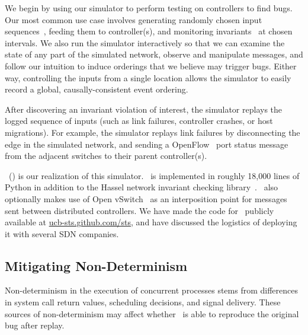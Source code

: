 We begin by using our simulator to perform testing on controllers to find
bugs. Our most common use case involves generating randomly chosen input
sequences~\cite{Miller:1990:ESR:96267.96279}, feeding them to controller(s),
and monitoring
invariants~\cite{hsa} at chosen intervals.
We also run the simulator interactively
so that we can examine the state of any part of the simulated network,
observe and manipulate messages, and follow our
intuition to induce orderings that we believe may trigger bugs.
Either way, controlling the inputs from a single location
allows the simulator to easily record a global, causally-consistent
event ordering.

After discovering an invariant violation of interest, the simulator replays
the logged sequence of inputs (such as link failures, controller crashes, or host
migrations). For example, the simulator replays link failures
by disconnecting the edge in the simulated network, and sending a
OpenFlow~\cite{openflow} port status message from the adjacent switches to their parent controller(s).

\projectname~(\projectmeaning) is our realization of this simulator.
\projectname~is implemented in roughly 18,000 lines of Python in
addition to the Hassel network invariant checking library~\cite{hsa}.
\projectname~also optionally makes use of Open vSwitch~\cite{pfaff2009extending} as an interposition point for
messages sent between distributed controllers. We have
made the code
for \projectname~publicly available at \href{http://ucb-sts.github.com/sts}{ucb-sts.github.com/sts},
and have discussed the logistics of deploying it with several SDN companies.



\subsection{Mitigating Non-Determinism}

Non-determinism in the execution of concurrent processes stems from
differences in system call return values, scheduling decisions, and signal
delivery. These sources of non-determinism may affect whether \projectname~is
able to reproduce the original bug after replay.

